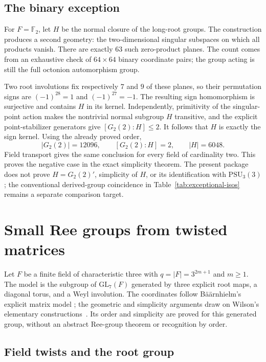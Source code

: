 \documentclass[11pt]{article}
\numberwithin{equation}{section}
\theoremstyle{definition}
\newcommand{\F}{\mathbb F}
\newcommand{\GL}{\mathrm{GL}}
\newcommand{\PSU}{\mathrm{PSU}}
\begin{document}
\subsection{The binary exception}

For $F=\F_2$, let $H$ be the normal closure of the long-root
groups. The construction produces a second geometry: the
two-dimensional singular subspaces on which all products vanish.
There are exactly $63$ such zero-product planes. The count comes from
an exhaustive check of $64\times64$ binary coordinate pairs; the
group acting is still the full octonion automorphism group.

Two root involutions fix respectively $7$ and $9$ of these planes,
so their permutation signs are $(-1)^{28}=1$ and $(-1)^{27}=-1$.
The resulting sign homomorphism is surjective and contains $H$ in
its kernel. Independently, primitivity of the singular-point action
makes the nontrivial normal subgroup $H$ transitive, and the explicit
point-stabilizer generators give $[G_2(2):H]\leq2$. It follows that
$H$ is exactly the sign kernel. Using the already proved order,
\[
 |G_2(2)|=12096,\qquad [G_2(2):H]=2,\qquad |H|=6048.
\]
Field transport gives the same conclusion for every field of
cardinality two. This proves the negative case in the exact simplicity
theorem. The present package does not prove $H=G_2(2)'$, simplicity
of $H$, or its identification with $\PSU_3(3)$; the conventional
derived-group coincidence in Table~\ref{tab:exceptional-isos} remains
a separate comparison target.


\section{Small Ree groups from twisted matrices}\label{sec:ree}

Let $F$ be a finite field of characteristic three with
$q=|F|=3^{2m+1}$ and $m\geq1$. The model is the subgroup of $\GL_7(F)$ generated
by three explicit root maps, a diagonal torus, and a Weyl involution.
The coordinates follow B\"a\"arnhielm's explicit matrix model
\cite[Section~3]{BaarnhielmRee}; the geometric and simplicity arguments
draw on Wilson's elementary constructions~\cite{WilsonRee,WilsonReeAlgebra}.
Its order and simplicity are proved
for this generated group, without an abstract Ree-group theorem or
recognition by order.

\subsection{Field twists and the root group}
\end{document}
